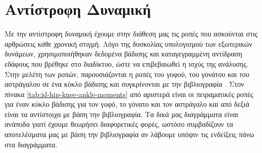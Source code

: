 \section{Αντίστροφη Δυναμική}

Με την αντίστροφη δυναμική έχουμε στην διάθεση μας τις ροπές που ασκούνται στις αρθρώσεις κάθε χρονική στιγμή. Λόγο της δυσκολίας υπολογισμού των εξωτερικών δυνάμεων, χρησιμοποιήθηκαν δεδομένα βάδισης και καταγεγραμμένη αντίδραση εδάφους που βρέθηκε στο διαδίκτυο, ώστε να επιβεβαιωθεί η ισχύς της ανάλυσης. Στην μελέτη των ροπών, παρουσιάζονται η ροπές του γοφού, του γονάτου και του αστράγαλου σε ένα κύκλο βάδισης και συγκρίνονται με την βιβλιογραφία \cite{whittlesey}. Στον πίνακα \ref{tab:id-hip-knee-ankle-moments} από αριστερά είναι οι πειραματικές ροπές για έναν κύκλο βάδισης για τον γοφό, το γόνατο και τον αστράγαλο και από δεξιά είναι τα αντίστοιχα με βάση την βιβλιογραφία. Τα δικά μας διαγράμματα είναι ανάποδα γιατί έχουμε θεωρήσει διαφορετικές φορές, ωστόσο συμβαδίζουν τα αποτελέσματα μας με βάση την βιβλιογραφία αν λάβουμε υπόψιν τις ενδείξεις πάνω στα διαγράμματα.

